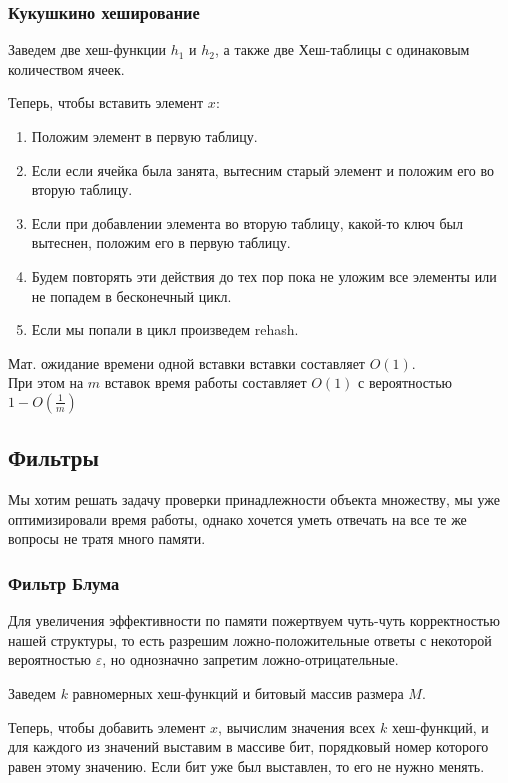 \subsubsection{Кукушкино хеширование}
Заведем две хеш-функции $h_1$ и  $h_2$, а также две Хеш-таблицы с одинаковым количеством ячеек.

Теперь, чтобы вставить элемент  $x$:
\begin{enumerate}
    \item Положим элемент в первую таблицу. 
    \item Если если ячейка была занята, вытесним старый элемент и положим его во вторую таблицу.
    \item Если при добавлении элемента во вторую таблицу, какой-то ключ был вытеснен, положим его в первую таблицу.
    \item Будем повторять эти действия до тех пор пока не уложим все элементы или не попадем в бесконечный цикл.
    \item Если мы попали в цикл произведем rehash.
\end{enumerate}

\begin{theorem}
    Мат. ожидание времени одной вставки вставки составляет $O(1)$. \\
    При этом на $m$ вставок время работы составляет  $O(1)$ с вероятностью  $1 - O(\frac{1}{m})$
\end{theorem}

\subsection{Фильтры}

Мы хотим решать задачу проверки принадлежности объекта множеству, мы уже оптимизировали время работы, однако 
хочется уметь отвечать на все те же вопросы не тратя много памяти. 

\subsubsection{Фильтр Блума}
Для увеличения эффективности по памяти пожертвуем чуть-чуть корректностью нашей структуры, то есть разрешим ложно-положительные ответы с некоторой вероятностью $\varepsilon$, 
но однозначно запретим ложно-отрицательные.

Заведем  $k$ равномерных хеш-функций и битовый массив размера  $M$.  

Теперь, чтобы добавить элемент $x$, вычислим значения всех $k$ хеш-функций, и для каждого из значений выставим в массиве бит, порядковый номер которого равен этому значению.
Если бит уже был выставлен, то его не нужно менять.

